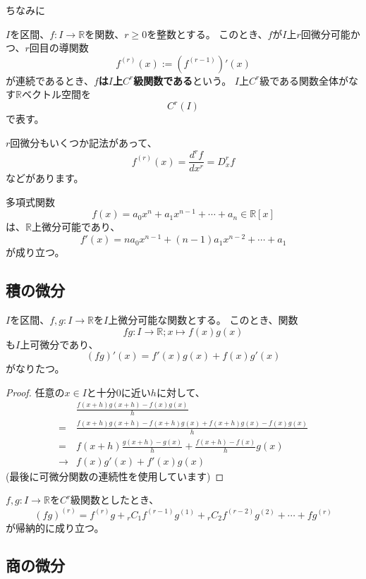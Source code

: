 ちなみに
\begin{definition}
  $I$を区間、$f:I\to\mathbb{R}$を関数、$r\geq0$を整数とする。
  このとき、$f$が$I$上$r$回微分可能かつ、$r$回目の導関数
  \[
    f^{(r)}(x):=(f^{(r-1)})'(x)
  \]
  が連続であるとき、\textbf{$f$は$I$上$C^r$級関数である}という。
  $I$上$C^r$級である関数全体がなす$\mathbb{R}$ベクトル空間を
  \[
    C^r(I)
  \]
  で表す。
\end{definition}
$r$回微分もいくつか記法があって、
\[
  f^{(r)}(x)=\frac{d^rf}{dx^r}=D_x^rf
\]
などがあります。

\begin{example}
  多項式関数
  \[
    f(x)=a_0x^n+a_1x^{n-1}+\cdots+a_n\in\mathbb{R}[x]
  \]
  は、$\mathbb{R}$上微分可能であり、
  \[
    f'(x)=na_0x^{n-1}+(n-1)a_1x^{n-2}+\cdots+a_1
  \]
  が成り立つ。
\end{example}

\subsection{積の微分}

\begin{theorem}
  $I$を区間、$f,g:I\to\mathbb{R}$を$I$上微分可能な関数とする。
  このとき、関数
  \[
    fg:I\to\mathbb{R};x\mapsto f(x)g(x)
  \]
  も$I$上可微分であり、
  \[
    (fg)'(x)=f'(x)g(x)+f(x)g'(x)
  \]
  がなりたつ。
\end{theorem}
\begin{proof}
  任意の$x\in I$と十分0に近い$h$に対して、
  \begin{align*}
    &\frac{f(x+h)g(x+h)-f(x)g(x)}{h}\\
    =&\frac{f(x+h)g(x+h)-f(x+h)g(x)+f(x+h)g(x)-f(x)g(x)}{h}\\
    =&f(x+h)\frac{g(x+h)-g(x)}{h}+\frac{f(x+h)-f(x)}{h}g(x)\\
    \to&f(x)g'(x)+f'(x)g(x)
  \end{align*}
  (最後に可微分関数の連続性を使用しています)
\end{proof}

\begin{example}
  $f,g:I\to\mathbb{R}$を$C^r$級関数としたとき、
  \[
    (fg)^{(r)}=f^{(r)}g+{}_rC_1f^{(r-1)}g^{(1)}+{}_rC_2f^{(r-2)}g^{(2)}+\cdots+fg^{(r)}
  \]
  が帰納的に成り立つ。
\end{example}

\subsection{商の微分}

